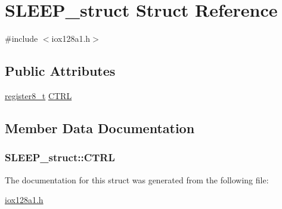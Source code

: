 \hypertarget{struct_s_l_e_e_p__struct}{
\section{SLEEP\_\-struct Struct Reference}
\label{struct_s_l_e_e_p__struct}
}


{\ttfamily \#include $<$iox128a1.h$>$}

\subsection*{Public Attributes}
\begin{DoxyCompactItemize}
\item 
\hyperlink{iox128a1_8h_a6a0649252b392263406882923b04a9db}{register8\_\-t} \hyperlink{struct_s_l_e_e_p__struct_a31dba390677ebccbdf7264bdba8fea2d}{CTRL}
\end{DoxyCompactItemize}


\subsection{Member Data Documentation}
\hypertarget{struct_s_l_e_e_p__struct_a31dba390677ebccbdf7264bdba8fea2d}{
\subsubsection[{CTRL}]{ {\bf SLEEP\_\-struct::CTRL}}}
\label{struct_s_l_e_e_p__struct_a31dba390677ebccbdf7264bdba8fea2d}


The documentation for this struct was generated from the following file:\begin{DoxyCompactItemize}
\item 
\hyperlink{iox128a1_8h}{iox128a1.h}\end{DoxyCompactItemize}
